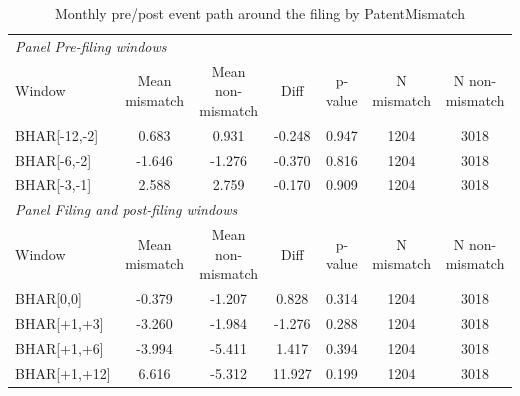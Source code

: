 \begin{table}[!htbp]
\centering
\caption{Monthly pre/post event path around the filing by PatentMismatch}
\begin{tabular}{lcccccc}
\hline
\multicolumn{7}{l}{\textit{Panel Pre-filing windows}} \\
Window & Mean mismatch & Mean non-mismatch & Diff & p-value & N mismatch & N non-mismatch \\
BHAR[-12,-2] & 0.683 & 0.931 & -0.248 & 0.947 & 1204 & 3018 \\
BHAR[-6,-2] & -1.646 & -1.276 & -0.370 & 0.816 & 1204 & 3018 \\
BHAR[-3,-1] & 2.588 & 2.759 & -0.170 & 0.909 & 1204 & 3018 \\
\multicolumn{7}{l}{\textit{Panel Filing and post-filing windows}} \\
Window & Mean mismatch & Mean non-mismatch & Diff & p-value & N mismatch & N non-mismatch \\
BHAR[0,0] & -0.379 & -1.207 & 0.828 & 0.314 & 1204 & 3018 \\
BHAR[+1,+3] & -3.260 & -1.984 & -1.276 & 0.288 & 1204 & 3018 \\
BHAR[+1,+6] & -3.994 & -5.411 & 1.417 & 0.394 & 1204 & 3018 \\
BHAR[+1,+12] & 6.616 & -5.312 & 11.927 & 0.199 & 1204 & 3018 \\
\hline
\end{tabular}
\end{table}
